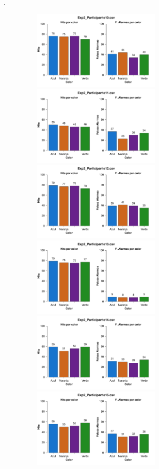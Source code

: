 \documentclass[a4paper ]{article}
\begin{document}
\vfill .
\begin{figure}[th]
\begin{center}
\includegraphics[width=8cm, height=4cm]{Figures/Color_Exp2_P10} \includegraphics[width=8cm, height=4cm]{Figures/Color_Exp2_P11} \includegraphics[width=8cm, height=4cm]{Figures/Color_Exp2_P12}
\includegraphics[width=8cm, height=4cm]{Figures/Color_Exp2_P13} \includegraphics[width=8cm, height=4cm]{Figures/Color_Exp2_P14} \includegraphics[width=8cm, height=4cm]{Figures/Color_Exp2_P15}

\end{center}
\end{figure}
\end{document}
